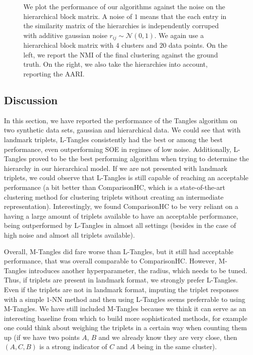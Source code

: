 \onecolumn
\begin{figure}[ht]
    \centering
    \caption{
        We plot the performance of our algorithms against the noise on the hierarchical block matrix. A noise of $1$ means that the each 
        entry in the similarity matrix of the hierarchies is independently corruped with additive gaussian noise $r_{ij} \sim \mathcal{N}(0, 1)$.
        We again use a hierarchical block matrix with $4$ clusters and $20$ data points. On the left, we report the NMI of the final clustering against the ground
        truth. On the right, we also take the hierarchies into account, reporting the AARI.
    }
    \label{fig:hierarchy-add-hierarchy-noise}
\end{figure}

\subsection{Discussion}
In this section, we have reported the performance of the Tangles algorithm on two synthetic data sets, gaussian and hierarchical data. 
We could see that with landmark triplets, L-Tangles consistently had the best or among the best performance, even outperforming 
SOE in regimes of low noise. Additionally, L-Tangles proved to be the best performing algorithm when 
trying to determine the hierarchy in our hierarchical model.  If we are not presented with landmark triplets, we could observe that L-Tangles is still capable of reaching 
an acceptable performance (a bit better than ComparisonHC, which is a state-of-the-art clustering method for clustering triplets without creating an intermediate representation). Interestingly, we found ComparisonHC to be very reliant on a having a large amount of triplets available to have an acceptable performance, being outperformed by L-Tangles in almost all settings (besides in the case of high noise and almost
all triplets available).

Overall, M-Tangles did fare worse than L-Tangles, but it still had acceptable performance, that was overall comparable to ComparisonHC. However, M-Tangles introduces another hyperparameter, 
the radius, which needs to be tuned. Thus, if triplets are present in landmark format, we strongly prefer L-Tangles. Even if the triplets are not in landmark format, imputing the triplet responses
with a simple $1$-NN method and then using L-Tangles seems preferrable to using M-Tangles. We have still included M-Tangles because we think it can serve as an interesting 
baseline from which to build more sophisticated methods, for example one could think about weighing the triplets in a certain way when counting them up (if we have two points $A$, $B$ and we already know
they are very close, then $(A, C, B)$ is a strong indicator of $C$ and $A$ being in the same cluster). 


